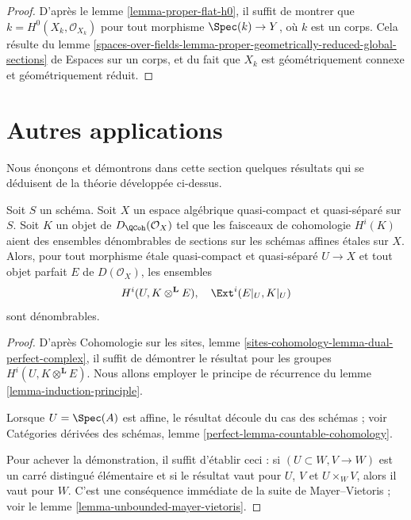 \begin{proof}
D'apr\`es le lemme \ref{lemma-proper-flat-h0}, il suffit de montrer que
$k=H^0(X_k,\mathcal{O}_{X_k})$ pour tout morphisme $\Spec(k)\to Y$, o\`u $k$
est un corps. Cela r\'esulte du lemme
\ref{spaces-over-fields-lemma-proper-geometrically-reduced-global-sections}
de Espaces sur un corps, et du fait que $X_k$ est g\'eom\'etriquement connexe
et g\'eom\'etriquement r\'eduit.
\end{proof}






\section{Autres applications}
\label{section-other-applications}

\noindent
Nous \'enon\c{c}ons et d\'emontrons dans cette section quelques r\'esultats qui
se d\'eduisent de la th\'eorie d\'evelopp\'ee ci-dessus.

\begin{lemma}
\label{lemma-countable-cohomology}
Soit $S$ un sch\'ema. Soit $X$ un espace alg\'ebrique quasi-compact et
quasi-s\'epar\'e sur $S$. Soit $K$ un objet de
$D_\QCoh(\mathcal{O}_X)$ tel que les faisceaux de cohomologie $H^i(K)$ aient
des ensembles d\'enombrables de sections sur les sch\'emas affines \'etales sur
$X$. Alors, pour tout morphisme \'etale quasi-compact et quasi-s\'epar\'e
$U\to X$ et tout objet parfait $E$ de $D(\mathcal{O}_X)$, les ensembles
$$
H^i(U, K \otimes^\mathbf{L} E),\quad \Ext^i(E|_U, K|_U)
$$
sont d\'enombrables.
\end{lemma}

\begin{proof}
D'apr\`es Cohomologie sur les sites, lemme
\ref{sites-cohomology-lemma-dual-perfect-complex}, il suffit de d\'emontrer le
r\'esultat pour les groupes $H^i(U,K\otimes^\mathbf{L}E)$.
Nous allons employer le principe de r\'ecurrence du lemme
\ref{lemma-induction-principle}.

\medskip\noindent
Lorsque $U=\Spec(A)$ est affine, le r\'esultat d\'ecoule du cas des sch\'emas ;
voir Cat\'egories d\'eriv\'ees des sch\'emas, lemme
\ref{perfect-lemma-countable-cohomology}.

\medskip\noindent
Pour achever la d\'emonstration, il suffit d'\'etablir ceci : si
$(U\subset W,V\to W)$ est un carr\'e distingu\'e \'el\'ementaire et si le
r\'esultat vaut pour $U$, $V$ et $U\times_WV$, alors il vaut pour $W$.
C'est une cons\'equence imm\'ediate de la suite de Mayer--Vietoris ; voir le
lemme \ref{lemma-unbounded-mayer-vietoris}.
\end{proof}

